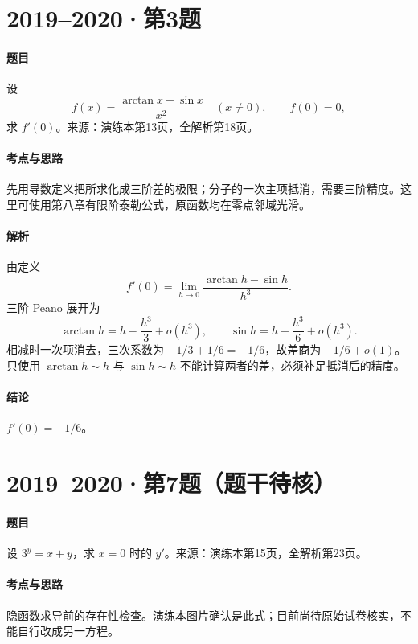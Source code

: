 \documentclass[UTF8,fontset=fandol,12pt,oneside,openany]{ctexrep}
\theoremstyle{definition}
\begin{document}
\par\addvspace{18pt}\noindent\begin{minipage}{\linewidth}
\section{2019--2020·第3题}
\paragraph{题目}设
\[
 f(x)=\frac{\arctan x-\sin x}{x^2}\quad(x\ne0),\qquad f(0)=0,
\]
求 $f'(0)$。来源：演练本第13页，全解析第18页。
\end{minipage}\par
\paragraph{考点与思路}先用导数定义把所求化成三阶差的极限；分子的一次主项抵消，需要三阶精度。这里可使用第八章有限阶泰勒公式，原函数均在零点邻域光滑。
\paragraph{解析}由定义
\[
 f'(0)=\lim_{h\to0}\frac{\arctan h-\sin h}{h^3}.
\]
三阶 Peano 展开为
\[
 \arctan h=h-\frac{h^3}3+o(h^3),\qquad
 \sin h=h-\frac{h^3}6+o(h^3).
\]
相减时一次项消去，三次系数为 $-1/3+1/6=-1/6$，故差商为 $-1/6+o(1)$。只使用 $\arctan h\sim h$ 与 $\sin h\sim h$ 不能计算两者的差，必须补足抵消后的精度。
\paragraph{结论}$f'(0)=-1/6$。

\par\addvspace{18pt}\noindent\begin{minipage}{\linewidth}
\section{2019--2020·第7题（题干待核）}
\paragraph{题目}设 $3^y=x+y$，求 $x=0$ 时的 $y'$。来源：演练本第15页，全解析第23页。
\end{minipage}\par
\paragraph{考点与思路}隐函数求导前的存在性检查。演练本图片确认是此式；目前尚待原始试卷核实，不能自行改成另一方程。
\end{document}
